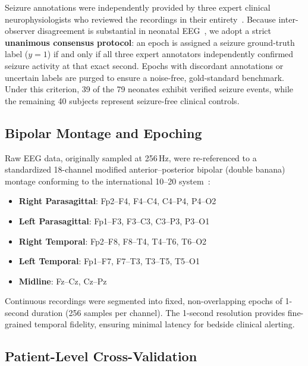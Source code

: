 \documentclass[10pt,twocolumn,letterpaper]{article}
\begin{document}
Seizure annotations were independently provided by three expert clinical neurophysiologists who reviewed the recordings in their entirety~\cite{stevenson2019}. Because inter-observer disagreement is substantial in neonatal EEG~\cite{stevenson2015}, we adopt a strict \textbf{unanimous consensus protocol}: an epoch is assigned a seizure ground-truth label ($y=1$) if and only if all three expert annotators independently confirmed seizure activity at that exact second. Epochs with discordant annotations or uncertain labels are purged to ensure a noise-free, gold-standard benchmark. Under this criterion, 39 of the 79 neonates exhibit verified seizure events, while the remaining 40 subjects represent seizure-free clinical controls.

\subsection{Bipolar Montage and Epoching}

Raw EEG data, originally sampled at 256\,Hz, were re-referenced to a standardized 18-channel modified anterior--posterior bipolar (double banana) montage conforming to the international 10--20 system~\cite{shellhaas2011}:
\begin{itemize}
    \item \textbf{Right Parasagittal}: Fp2--F4, F4--C4, C4--P4, P4--O2
    \item \textbf{Left Parasagittal}: Fp1--F3, F3--C3, C3--P3, P3--O1
    \item \textbf{Right Temporal}: Fp2--F8, F8--T4, T4--T6, T6--O2
    \item \textbf{Left Temporal}: Fp1--F7, F7--T3, T3--T5, T5--O1
    \item \textbf{Midline}: Fz--Cz, Cz--Pz
\end{itemize}
Continuous recordings were segmented into fixed, non-overlapping epochs of 1-second duration (256 samples per channel). The 1-second resolution provides fine-grained temporal fidelity, ensuring minimal latency for bedside clinical alerting.

\subsection{Patient-Level Cross-Validation}
\end{document}
